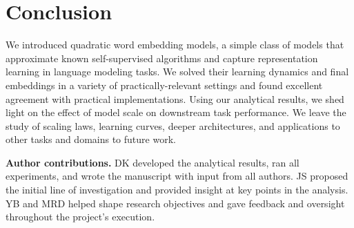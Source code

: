 \section{Conclusion}

We introduced quadratic word embedding models, a simple class of models that approximate known self-supervised algorithms and capture representation learning in language modeling tasks. We solved their learning dynamics and final embeddings in a variety of practically-relevant settings and found excellent agreement with practical implementations. Using our analytical results, we shed light on the effect of model scale on downstream task performance. We leave the study of scaling laws, learning curves, deeper architectures, and applications to other tasks and domains to future work.

\textbf{Author contributions.} DK developed the analytical results, ran all experiments, and wrote the manuscript with input from all authors. JS proposed the initial line of investigation and provided insight at key points in the analysis. YB and MRD helped shape research objectives and gave feedback and oversight throughout the project's execution.

